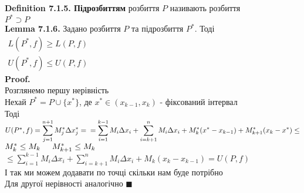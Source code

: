 \documentclass[a4paper, 14pt]{extarticle}
\def\huge{\displaystyle}
\def\bigline{\vspace{5mm}\\}
\def\defin#1{\textbf{Definition {#1}}}
\def\lm#1{\textbf{Lemma {#1}}}
\def\proof{\textbf{Proof.}\\}
\def\bigline{\vspace{5mm}\\}
\def\qed{$\blacksquare$}
\begin{document}
\defin{7.1.5. Підрозбиттям} розбиття $P$ називають розбиття \\ $P^* \supset P$
\bigline
\lm{7.1.6.} Задано розбиття $P$ та підрозбиття $P^*$. Тоді $\begin{gathered} L(P^*,f) \geq L(P,f) \\ U(P^*,f) \leq U(P,f) \end{gathered}$\\
\proof
Розглянемо першу нерівність\\
Нехай $P^* = P \cup \{x^*\}$, де $x^* \in (x_{k-1}, x_k)$ - фіксований інтервал\\
Тоді $U(P^*, f) = \huge\sum_{j=1}^{n+1} M_j^* \Delta x_j^* = \\ = \huge \sum_{i=1}^{k-1} M_i \Delta x_i + \sum_{i=k+1}^{n} M_i \Delta x_i + M^*_k (x^* - x_{k-1}) + M^*_{k+1} (x_k - x^*) \leq$\\
$M_k^* \leq M_k \hspace{0.5cm} M_{k+1}^* \leq M_k$\\
$\leq \huge \sum_{i=1}^{k-1} M_i \Delta x_i + \sum_{i=k+1}^n M_i \Delta x_i + M_k (x_k - x_{k-1}) = U(P,f)$\\
І так ми можем додавати по точці скільки нам буде потрібно\\
Для другої нерівності аналогічно \qed
\end{document}
